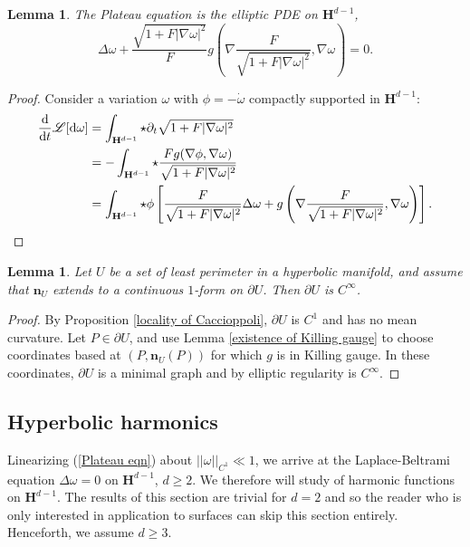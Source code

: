\documentclass[reqno,12pt,letterpaper]{amsart}
\newcommand{\Hyp}{\mathbf H}
\newcommand*\dif{\mathop{}\!\mathrm{d}}
\newcommand{\Lagrange}{\mathscr L}
\newcommand{\normal}{\mathbf n}
\newtheorem{lemma}[theorem]{Lemma}
\theoremstyle{definition}
\numberwithin{equation}{section}
\begin{document}
\begin{lemma}
The Plateau equation is the elliptic PDE on $\Hyp^{d - 1}$,
\begin{equation}\label{Plateau eqn}
\Delta \omega + \frac{\sqrt{1 + F |\nabla \omega|^2}}{F} g\left(\nabla \frac{F}{\sqrt{1 + F |\nabla \omega|^2}}, \nabla \omega\right) = 0.
\end{equation}
\end{lemma}
\begin{proof}
Consider a variation $\omega$ with $\phi = -\dot \omega$ compactly supported in $\Hyp^{d - 1}$:
\begin{align*}
\frac{\dif}{\dif t} \Lagrange[\dif \omega] &= \int_{\Hyp^{d - 1}} \star \partial_t \sqrt{1 + F |\nabla \omega|^2} \\
&= -\int_{\Hyp^{d - 1}} \star \frac{F g(\nabla \phi, \nabla \omega)}{\sqrt{1 + F|\nabla \omega|^2}} \\
&= \int_{\Hyp^{d - 1}} \star \phi\left[\frac{F}{\sqrt{1 + F |\nabla \omega|^2}} \Delta \omega + g\left(\nabla \frac{F}{\sqrt{1 + F |\nabla \omega|^2}}, \nabla \omega\right)\right]. \qedhere
\end{align*}
\end{proof}

\begin{lemma}\label{C1 implies smooth}
Let $U$ be a set of least perimeter in a hyperbolic manifold, and assume that $\normal_U$ extends to a continuous $1$-form on $\partial U$.
Then $\partial U$ is $C^\infty$.
\end{lemma}
\begin{proof}
By Proposition \ref{locality of Caccioppoli}, $\partial U$ is $C^1$ and has no mean curvature.
Let $P \in \partial U$, and use Lemma \ref{existence of Killing gauge} to choose coordinates based at $(P, \normal_U(P))$ for which $g$ is in Killing gauge.
In these coordinates, $\partial U$ is a minimal graph and by elliptic regularity is $C^\infty$.
\end{proof}

\subsection{Hyperbolic harmonics}
Linearizing (\ref{Plateau eqn}) about $||\omega||_{C^1} \ll 1$, we arrive at the Laplace-Beltrami equation $\Delta \omega = 0$ on $\Hyp^{d - 1}$, $d \geq 2$.
We therefore will study of harmonic functions on $\Hyp^{d - 1}$.
The results of this section are trivial for $d = 2$ and so the reader who is only interested in application to surfaces can skip this section entirely.
Henceforth, we assume $d \geq 3$.
\end{document}
